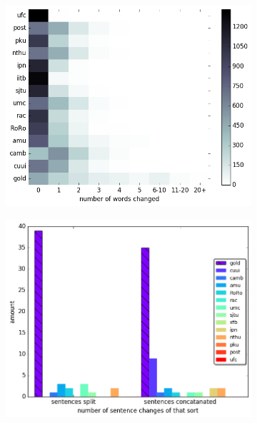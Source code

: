 \documentclass[letter,11pt]{article}
\begin{document}
\begin{figure}
  \centering
  \begin{subfigure}[]{0.4\textwidth}
    \includegraphics[width = \textwidth]{words_differences_heat}
  \end{subfigure}
  \begin{subfigure}[]{0.4\textwidth}
    \includegraphics[width = \textwidth]{aligned}
  \end{subfigure}
  \begin{subfigure}[]{0.4\textwidth}

\end{subfigure}
\end{figure}
\end{document}
